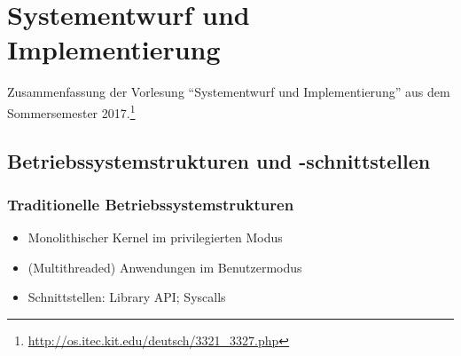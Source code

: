 \chapter{Systementwurf und Implementierung}

Zusammenfassung der Vorlesung "`Systementwurf und Implementierung"' aus dem Sommersemester 2017.\footnote{\url{http://os.itec.kit.edu/deutsch/3321_3327.php}}

\section{Betriebssystemstrukturen und -schnittstellen}

\subsection{Traditionelle Betriebssystemstrukturen}
\begin{itemize}
	\item Monolithischer Kernel im privilegierten Modus
	\item (Multithreaded) Anwendungen im Benutzermodus
	\item Schnittstellen: Library API; Syscalls
\end{itemize}


